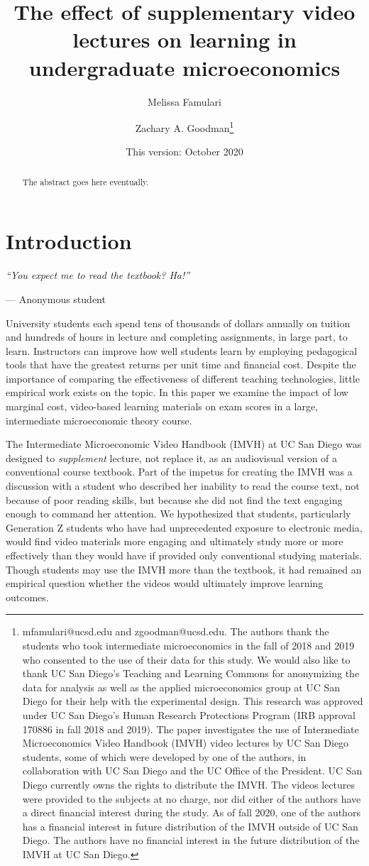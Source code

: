 \documentclass[12pt]{article}
\title{The effect of supplementary video lectures on learning in undergraduate microeconomics}
\author{Melissa Famulari}
\author{Zachary A. Goodman\thanks{mfamulari@ucsd.edu and zgoodman@ucsd.edu. The authors thank the students who took intermediate microeconomics in the fall of 2018 and 2019 who consented to the use of their data for this study.  We would also like to thank UC San Diego's Teaching and Learning Commons for anonymizing the data for analysis as well as the applied microeconomics group at UC San Diego for their help with the experimental design.  This research was approved under UC San Diego's Human Research Protections Program (IRB approval 170886 in fall 2018 and 2019).  The paper investigates the use of Intermediate Microeconomics Video Handbook (IMVH) video lectures by UC San Diego students, some of which were developed by one of the authors, in collaboration with UC San Diego and the UC Office of the President.  UC San Diego currently owns the rights to distribute the IMVH.  The videos lectures were provided to the subjects at no charge, nor did either of the authors have a direct financial interest during the study.  As of fall 2020, one of the authors has a financial interest in future distribution of the IMVH outside of UC San Diego. The authors have no financial interest in the future distribution of the IMVH at UC San Diego.}}
\affil{University of California, San Diego}
\date{This version: October 2020} %
\begin{document}
\maketitle 
\begin{abstract}
	The abstract goes here eventually.
\end{abstract}

\newpage


\section{Introduction}

\epigraph{\textit{``You expect me to read the textbook? Ha!''}}{--- Anonymous student}\bigskip

University students each spend tens of thousands of dollars annually on tuition and hundreds of hours in lecture and completing assignments, in large part, to learn. Instructors can improve how well students learn by employing pedagogical tools that have the greatest returns per unit time and financial cost. Despite the importance of comparing the effectiveness of different teaching technologies, little empirical work exists on the topic. In this paper we examine the impact of low marginal cost, video-based learning materials on exam scores in a large, intermediate microeconomic theory course. %

The Intermediate Microeconomic Video Handbook (IMVH) at UC San Diego was designed to \textit{supplement} lecture, not replace it, as an audiovisual version of a conventional course textbook. Part of the impetus for creating the IMVH was a discussion with a student who described her inability to read the course text, not because of poor reading skills, but because she did not find the text engaging enough to command her attention. We hypothesized that students, particularly Generation Z students who have had unprecedented exposure to electronic media, would find video materials more engaging and ultimately study more or more effectively than they would have if provided only conventional studying materials. Though students may use the IMVH more than the textbook, it had remained an empirical question whether the videos would ultimately improve learning outcomes. %
\end{document}
